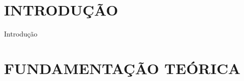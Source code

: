 \documentclass[a4paper,12pt]{article}
\begin{document}

%
%
%
%


\thispagestyle{empty}

\begin{center}
\listoffigures
\end{center}

\newpage


\thispagestyle{empty}

\begin{center}
\tableofcontents
\end{center}

\newpage


\thispagestyle{main}

\section{INTRODUÇÃO}

\begin{justify}
    Introdução
\end{justify}

\newpage


\section{FUNDAMENTAÇÃO TEÓRICA}
\end{document}
